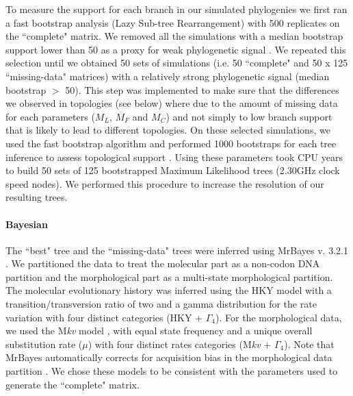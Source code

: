 \documentclass[10pt,letterpaper]{article}
\begin{document}
To measure the support for each branch in our simulated phylogenies we first ran a fast bootstrap analysis (Lazy Sub-tree Rearrangement) with 500 replicates on the ``complete" matrix. We removed all the simulations with a median bootstrap support lower than 50 as a proxy for weak phylogenetic signal \cite{zanderminimal2004}. We repeated this selection until we obtained 50 sets of simulations (i.e. 50 ``complete" and 50 x 125 ``missing-data" matrices) with a relatively strong phylogenetic signal (median bootstrap $>$ 50). This step was implemented to make sure that the differences we observed in topologies (see below) where due to the amount of missing data for each parameters ($M_L$, $M_F$ and $M_C$) and not simply to low branch support that is likely to lead to different topologies. On these selected simulations, we used the fast bootstrap algorithm and performed 1000 bootstraps for each tree inference to assess topological support \cite{pattengale2010many}. Using these parameters took  CPU years to build 50 sets of 125 bootstrapped Maximum Likelihood trees (2.30GHz clock speed nodes). We performed this procedure to increase the resolution of our resulting trees. 

\paragraph*{Bayesian}
The ``best" tree and the ``missing-data" trees were inferred using MrBayes v. 3.2.1 \cite{Ronquist2012mrbayes}. We partitioned the data to treat the molecular part as a non-codon DNA partition and the morphological part as a multi-state morphological partition. The molecular evolutionary history was inferred using the HKY model with a transition/transversion ratio of two \cite{douadycomparison2003} and a gamma distribution for the rate variation with four distinct categories (HKY + $\Gamma_4$). For the morphological data, we used the M\textit{kv} model \cite{lewisa2001}, with equal state frequency and a unique overall substitution rate ($\mu$) with four distinct rates categories (M\textit{kv} + $\Gamma_4$). Note that MrBayes automatically corrects for acquisition bias in the morphological data partition \cite{Nylander01022004,Ronquist2012mrbayes}. We chose these models to be consistent with the parameters used to generate the ``complete" matrix.
\end{document}
